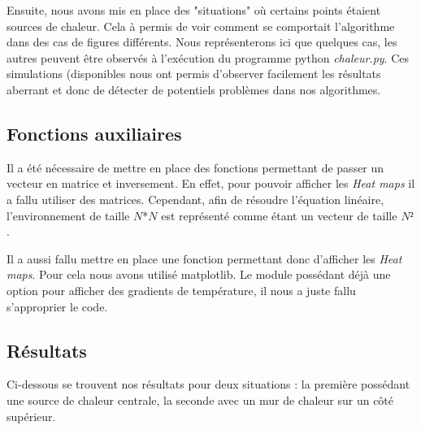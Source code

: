 \documentclass{article}
\begin{document}
Ensuite, nous avons mis en place des "situations" où certains points étaient sources de chaleur. Cela à permis de voir comment se comportait l'algorithme dans des cas de figures différents. Nous représenterons ici que quelques cas, les autres peuvent être observés à l'exécution du programme python \emph{chaleur.py}. Ces simulations (disponibles nous ont permis d'observer facilement les résultats aberrant et donc de détecter de potentiels problèmes dans nos algorithmes.



\subsection{Fonctions auxiliaires}
\label{ssec:fonc_aux}
Il a été nécessaire de mettre en place des fonctions permettant de passer un vecteur en matrice et inversement.
En effet, pour pouvoir afficher les \emph{Heat maps} il a fallu utiliser des matrices. Cependant, afin de résoudre l'équation linéaire, l'environnement de taille $N$*$N$ est représenté comme étant un vecteur de taille $N²$.

Il a aussi fallu mettre en place une fonction permettant donc d'afficher les \emph{Heat maps}. Pour cela nous avons utilisé matplotlib.
Le module possédant déjà une option pour afficher des gradients de température, il nous a juste fallu s'approprier le code.


\subsection{Résultats}
\label{ssec:res}
Ci-dessous se trouvent nos résultats pour deux situations : la première possédant une source de chaleur centrale, la seconde avec un mur de chaleur sur un côté supérieur.
\end{document}

